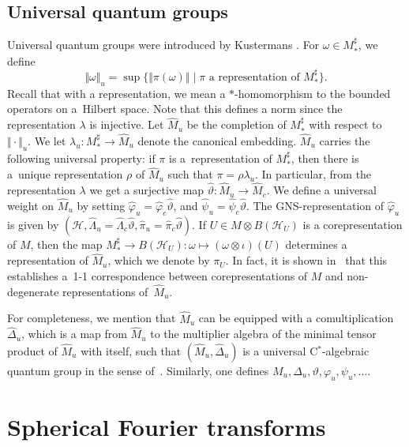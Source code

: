 \documentclass[11pt]{article}
\numberwithin{equation}{section}
\theoremstyle{definition}
\newcommand{\cHil}{\mathcal{H}}
\begin{document}
\subsection*{Universal quantum groups}
Universal quantum groups were introduced by Kustermans \cite{Kus}.
 For $\omega \in M_\ast^\sharp$, we def\/ine
\[
    \Vert \omega \Vert_u = \sup \{ \Vert \pi(\omega) \Vert \mid \pi \textrm{ a }   \textrm{representation of } M_\ast^\sharp   \}.
\]
Recall that with a representation, we mean a $\ast$-homomorphism to the bounded operators on a~Hilbert space.
Note that this def\/ines a norm since the representation $\lambda$ is injective.
 Let $\hat{M}_u$ be the completion of $M_\ast^\sharp$ with respect to $\Vert \cdot \Vert_u$. We let $\lambda_u: M_\ast^\sharp \rightarrow \hat{M}_u$ denote the canonical embedding. $\hat{M}_u$ carries the following universal property: if $\pi$ is a~representation of $M_\ast^\sharp$, then there is a~unique representation $\rho$ of $\hat{M}_u$ such that $\pi = \rho \lambda_u$. In particular, from the representation $\lambda$ we get a surjective map $\hat{\vartheta}: \hat{M}_u \rightarrow \hat{M}_c$. We def\/ine a universal weight on $\hat{M}_u$ by setting $\hat{\varphi}_u = \hat{\varphi}_c \hat{\vartheta}$, and $\hat{\psi}_u = \hat{\psi}_c \hat{\vartheta}$. The GNS-representation of $\hat{\varphi}_u$ is given by $(\cHil, \hat{\Lambda}_u = \hat{\Lambda}_c \hat{\vartheta}, \hat{\pi}_u = \hat{\pi}_c \hat{\vartheta})$. If $U \in M \otimes B(\cHil_U)$ is a corepresentation of $M$, then the map $M_\ast^\sharp \rightarrow B(\cHil_U): \omega \mapsto (\omega \otimes \iota)(U)$ determines a representation of $\hat{M}_u$, which we denote by $\pi_U$. In fact, it is shown in~\cite{Kus} that this establishes a~1-1 correspondence between corepresentations of $M$ and non-degenerate representations of~$\hat{M}_u$.

For completeness, we mention that $\hat{M}_u$ can be equipped with a comultiplication $\hat{\Delta}_u$, which is a map from $\hat{M}_u$ to the multiplier algebra of the minimal tensor product of $\hat{M}_u$ with itself, such that $(\hat{M}_u, \hat{\Delta}_u)$ is a universal C$^\ast$-algebraic quantum group in the sense of~\cite{Kus}.
Similarly, one def\/ines $M_u, \Delta_u, \vartheta, \varphi_u, \psi_u, \ldots$.


\section{Spherical Fourier transforms}\label{SectHomogeneousSpaces}
\end{document}
